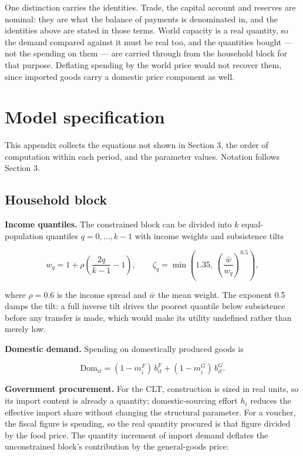 \documentclass[preprint,review,12pt]{elsarticle}
\begin{document}
One distinction carries the identities. Trade, the capital account and
reserves are nominal: they are what the balance of payments is denominated in,
and the identities above are stated in those terms. World capacity is a real
quantity, so the demand compared against it must be real too, and the
quantities bought --- not the spending on them --- are carried through from
the household block for that purpose. Deflating spending by the world price
would not recover them, since imported goods carry a domestic price component
as well.

\clearpage
\section{Model specification}

This appendix collects the equations not shown in Section 3, the order
of computation within each period, and the parameter values. Notation
follows Section 3.

\subsection{Household block}

\textbf{Income quantiles.} The constrained block can be divided into
\(k\) equal-population quantiles \(q = 0, \ldots, k-1\) with income
weights and subsistence tilts

\[w_q = 1 + \rho \left( \frac{2q}{k-1} - 1 \right), \qquad \zeta_q = \min\left( 1.35,\; \left( \frac{\bar{w}}{w_q} \right)^{0.5} \right), \tag{B.1}\]

where \(\rho = 0.6\) is the income spread and \(\bar{w}\) the mean
weight. The exponent 0.5 damps the tilt: a full inverse tilt drives the
poorest quantile below subsistence before any transfer is made, which
would make its utility undefined rather than merely low.

\textbf{Domestic demand.} Spending on domestically produced goods is

\[\mathrm{Dom}_{it} = (1 - m^F_i) \, b^F_{it} + (1 - m^G_i) \, b^G_{it}. \tag{B.2}\]

\textbf{Government procurement.} For the CLT, construction is sized in
real units, so its import content is already a quantity;
domestic-sourcing effort \(h_i\) reduces the effective import share
without changing the structural parameter. For a voucher, the fiscal
figure is spending, so the real quantity procured is that figure divided
by the food price. The quantity increment of import demand deflates the
unconstrained block's contribution by the general-goods price:
\end{document}
